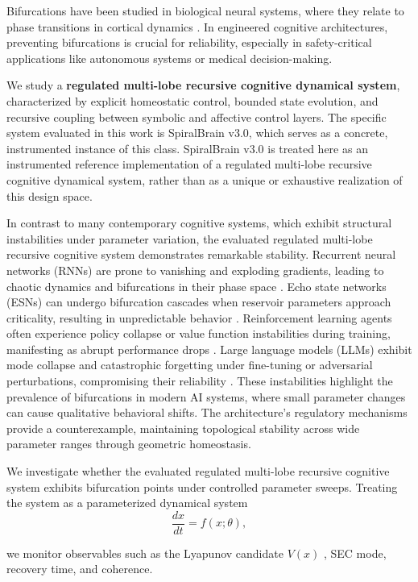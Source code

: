 \documentclass[11pt,a4paper]{article}
\begin{document}
Bifurcations have been studied in biological neural systems, where they relate to phase transitions in cortical dynamics \cite{Ott2002}. In engineered cognitive architectures, preventing bifurcations is crucial for reliability, especially in safety-critical applications like autonomous systems or medical decision-making.

We study a \textbf{regulated multi-lobe recursive cognitive dynamical system}, characterized by explicit homeostatic control, bounded state evolution, and recursive coupling between symbolic and affective control layers. The specific system evaluated in this work is SpiralBrain v3.0, which serves as a concrete, instrumented instance of this class. SpiralBrain v3.0 is treated here as an instrumented reference implementation of a regulated multi-lobe recursive cognitive dynamical system, rather than as a unique or exhaustive realization of this design space.

In contrast to many contemporary cognitive systems, which exhibit structural instabilities under parameter variation, the evaluated regulated multi-lobe recursive cognitive system demonstrates remarkable stability. Recurrent neural networks (RNNs) are prone to vanishing and exploding gradients, leading to chaotic dynamics and bifurcations in their phase space \cite{Hochreiter1997}. Echo state networks (ESNs) can undergo bifurcation cascades when reservoir parameters approach criticality, resulting in unpredictable behavior \cite{Jaeger2001}. Reinforcement learning agents often experience policy collapse or value function instabilities during training, manifesting as abrupt performance drops \cite{Mnih2015}. Large language models (LLMs) exhibit mode collapse and catastrophic forgetting under fine-tuning or adversarial perturbations, compromising their reliability \cite{Radford2019}. These instabilities highlight the prevalence of bifurcations in modern AI systems, where small parameter changes can cause qualitative behavioral shifts. The architecture's regulatory mechanisms provide a counterexample, maintaining topological stability across wide parameter ranges through geometric homeostasis.

We investigate whether the evaluated regulated multi-lobe recursive cognitive system exhibits bifurcation points under controlled parameter sweeps. Treating the system as a parameterized dynamical system
\[
  \frac{dx}{dt} = f(x; \theta),
\]

we monitor observables such as the Lyapunov candidate \(V(x)\) \cite{Strogatz2018}, SEC mode, recovery time, and coherence.
\end{document}
